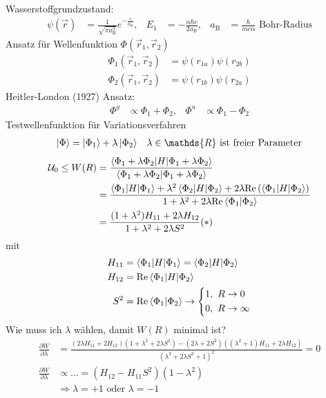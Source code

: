Wasserstoffgrundzustand:
	\begin{align*}
		\psi (\vec{r}) &= \frac{1}{\sqrt{\pi a_{\mathrm{B}}^3}}
		e^{-\frac{r}{a_{\mathrm{B}}}} ,&
		E_1 &= -\frac{\alpha \hbar c}{2 a_{\mathrm{B}}} ,&
		a_{\mathrm{B}} &= \frac{\hbar}{m c \alpha} \text{ Bohr-Radius}
	\end{align*}
Ansatz für Wellenfunktion $\Phi(\vec{r}_1, \vec{r}_2)$
	\begin{align*}
		\Phi_1 (\vec{r}_1, \vec{r}_2) &= \psi (r_{1a}) \psi(r_{2b}) \\
		\Phi_2 (\vec{r}_1, \vec{r}_2) &= \psi (r_{1b}) \psi(r_{2a})
	\end{align*}
Heitler-London (1927) Ansatz:
	\begin{align*}
		\Phi^g &\propto \Phi_1 + \Phi_2 ,&
		\Phi^u &\propto \Phi_1 - \Phi_2
	\end{align*} 
Testwellenfunktion für Variationsverfahren
	\begin{align*}
		\ket{\Phi} &= \ket{\Phi_1} + \lambda \ket{\Phi_2}
		& \lambda \in \mathds{R} \text{ ist freier Parameter}
	\end{align*}
	\begin{align*}
		\mathcal{U}_0 \leq W(R) &=
		\frac{\braket{\Phi_1 + \lambda \Phi_2 | H | \Phi_1 + \lambda \Phi_2}}{\braket{\Phi_1 + \lambda \Phi_2 | \Phi_1 + \lambda \Phi_2}} \\
		&= \frac{\braket{\Phi_1 | H | \Phi_1} + \lambda^2 \braket{\Phi_2 | H | \Phi_2} + 2 \lambda \mathrm{Re} \left(\braket{\Phi_1 | H | \Phi_2}\right)}{1 + \lambda^2 + 2 \lambda \mathrm{Re} \braket{\Phi_1 | \Phi_2}} \\
		&= \frac{(1 + \lambda^2) H_{11} + 2 \lambda H_{12}}{1 + \lambda^2 + 2 \lambda S^2}
		(*)
	\end{align*} 
mit
	\begin{align*}
		H_{11} &= \braket{\Phi_1 | H | \Phi_1} = \braket{\Phi_2 | H | \Phi_2}\\
		H_{12} &= \mathrm{Re} \braket{\Phi_1 | H | \Phi_2}\\
		S^2 &= \mathrm{Re} \braket{\Phi_1 | \Phi_2} \rightarrow
		\left\{
		\begin{aligned}
			1 &,~ R \rightarrow 0 \\
			0 &,~ R \rightarrow \infty
		\end{aligned}
		\right.
	\end{align*}
Wie muss ich $\lambda$ wählen, damit $W(R)$ minimal ist?
	\begin{align*}
		\frac{\partial W}{\partial \lambda} 
		&= \frac{(2 \lambda H_{11} + 2 H_{12}) (1 + \lambda^2 + 2 \lambda S^2) - (2 \lambda + 2 S^2) ((\lambda^2 + 1)H_{11} + 2 \lambda H_{12})}{(\lambda^2 + 2 \lambda S^2 + 1)^2}
		= 0 \\
		\frac{\partial W}{\partial \lambda} &\propto \ldots 
		= (H_{12} - H_{11} S^2) (1 - \lambda^2)\\
		&\Rightarrow \lambda = + 1 \text{ oder } \lambda = -1
	\end{align*}
